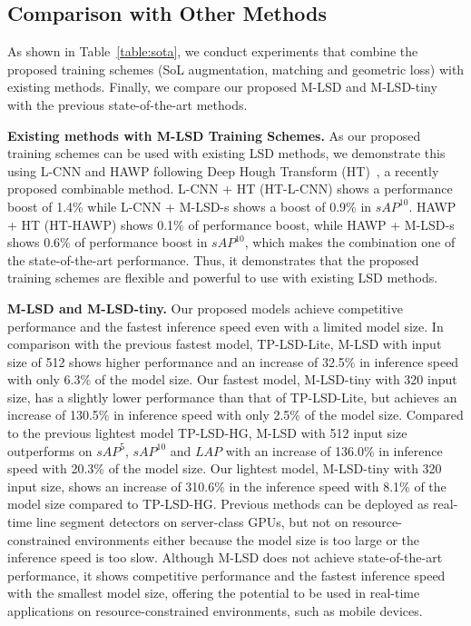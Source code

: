\documentclass[letterpaper]{article} \usepackage{aaai22}  \usepackage{times}  \usepackage{helvet}  \usepackage{courier}  \usepackage[hyphens]{url}  \usepackage{graphicx} \urlstyle{rm} \def\UrlFont{\rm}  \usepackage{natbib}  \usepackage{caption} \DeclareCaptionStyle{ruled}{labelfont=normalfont,labelsep=colon,strut=off} \frenchspacing  \setlength{\pdfpagewidth}{8.5in}  \setlength{\pdfpageheight}{11in}  \usepackage{algorithm}
\begin{document}
\subsection{Comparison with Other Methods}
\label{sec:sota}
As shown in Table~\ref{table:sota}, we conduct experiments that combine the proposed training schemes (SoL augmentation, matching and geometric loss) with existing methods.
Finally, we compare our proposed M-LSD and M-LSD-tiny with the previous state-of-the-art methods.

\textbf{Existing methods with M-LSD Training Schemes. }
As our proposed training schemes can be used with existing LSD methods, we demonstrate this using L-CNN and HAWP following Deep Hough Transform (HT)~\cite{lin2020deep}, a recently proposed combinable method.
L-CNN + HT (HT-L-CNN) shows a performance boost of 1.4\% while L-CNN + M-LSD-s shows a boost of 0.9\% in $sAP^{10}$.
HAWP + HT (HT-HAWP) shows 0.1\% of performance boost, while HAWP + M-LSD-s shows 0.6\% of performance boost in $sAP^{10}$, which makes the combination one of the state-of-the-art performance.
Thus, it demonstrates that the proposed training schemes are flexible and powerful to use with existing LSD methods.

\textbf{M-LSD and M-LSD-tiny. }
Our proposed models achieve competitive performance and the fastest inference speed even with a limited model size.
In comparison with the previous fastest model, TP-LSD-Lite, M-LSD with input size of 512 shows higher performance and an increase of 32.5\% in inference speed with only 6.3\% of the model size.
Our fastest model, M-LSD-tiny with 320 input size, has a slightly lower performance than that of TP-LSD-Lite, but achieves an increase of 130.5\% in inference speed with only 2.5\% of the model size.
Compared to the previous lightest model TP-LSD-HG, M-LSD with 512 input size outperforms on $sAP^{5}$, $sAP^{10}$ and $LAP$ with an increase of 136.0\% in inference speed with 20.3\% of the model size.
Our lightest model, M-LSD-tiny with 320 input size, shows an increase of 310.6\% in the inference speed with 8.1\% of the model size compared to TP-LSD-HG.
Previous methods can be deployed as real-time line segment detectors on server-class GPUs, but not on resource-constrained environments either because the model size is too large or the inference speed is too slow.
Although M-LSD does not achieve state-of-the-art performance, it shows competitive performance and the fastest inference speed with the smallest model size, offering the potential to be used in real-time applications on resource-constrained environments, such as mobile devices.
\end{document}
